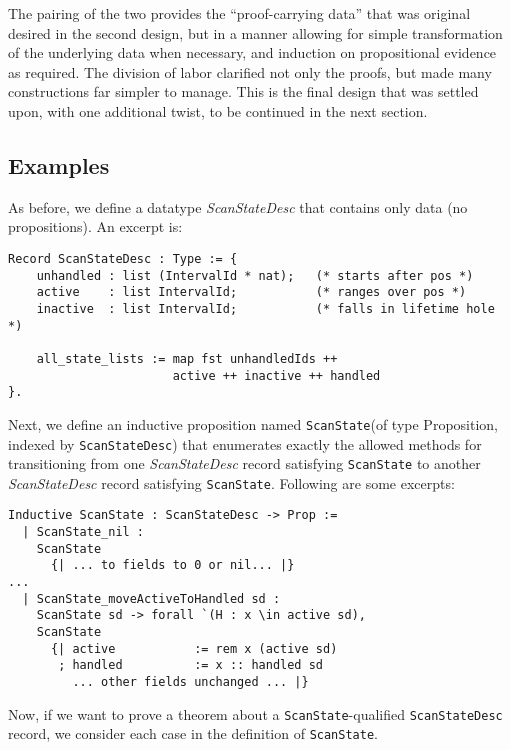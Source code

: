 \documentclass{llncs}
\begin{document}
The pairing of the two provides the ``proof-carrying data'' that
was original desired in the second design, but in a manner allowing for simple
transformation of the underlying data when necessary, and induction on
propositional evidence as required.  The division of labor clarified not only
the proofs, but made many constructions far simpler to manage.  This is the
final design that was settled upon, with one additional twist, to be continued
in the next section.

\subsection{Examples}
\label{sec:examplesv3}

As before, we define a datatype \emph{ScanStateDesc} that contains
only data (no propositions). An excerpt is:
\begin{verbatim}
Record ScanStateDesc : Type := {
    unhandled : list (IntervalId * nat);   (* starts after pos *)
    active    : list IntervalId;           (* ranges over pos *)
    inactive  : list IntervalId;           (* falls in lifetime hole *)

    all_state_lists := map fst unhandledIds ++
                       active ++ inactive ++ handled
}.
\end{verbatim}

Next, we define an inductive proposition named \texttt{ScanState}(of type
Proposition, indexed by \texttt{ScanStateDesc}) that enumerates exactly the
allowed methods for transitioning from one \emph{ScanStateDesc} record
satisfying \texttt{ScanState} to another \emph{ScanStateDesc} record
satisfying \texttt{ScanState}. Following are some excerpts:

\begin{verbatim}
Inductive ScanState : ScanStateDesc -> Prop :=
  | ScanState_nil :
    ScanState
      {| ... to fields to 0 or nil... |}
...
  | ScanState_moveActiveToHandled sd :
    ScanState sd -> forall `(H : x \in active sd),
    ScanState
      {| active           := rem x (active sd)
       ; handled          := x :: handled sd
         ... other fields unchanged ... |}
\end{verbatim}

Now, if we want to prove a theorem about a \texttt{ScanState}-qualified
\texttt{ScanStateDesc} record, we consider each case in the definition of
\texttt{ScanState}.

% 
\end{document}
